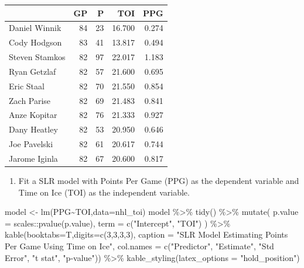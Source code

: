 \documentclass[
  11pt,
]{book}
\newenvironment{Shaded}{\begin{snugshade}}{\end{snugshade}}
\newcommand{\AttributeTok}[1]{\textcolor[rgb]{0.77,0.63,0.00}{#1}}
\newcommand{\DecValTok}[1]{\textcolor[rgb]{0.00,0.00,0.81}{#1}}
\newcommand{\FunctionTok}[1]{\textcolor[rgb]{0.00,0.00,0.00}{#1}}
\newcommand{\NormalTok}[1]{#1}
\newcommand{\OtherTok}[1]{\textcolor[rgb]{0.56,0.35,0.01}{#1}}
\newcommand{\SpecialCharTok}[1]{\textcolor[rgb]{0.00,0.00,0.00}{#1}}
\newcommand{\StringTok}[1]{\textcolor[rgb]{0.31,0.60,0.02}{#1}}
\providecommand{\tightlist}{%
  \setlength{\itemsep}{0pt}\setlength{\parskip}{0pt}}
\theoremstyle{definition}
\theoremstyle{definition}
\theoremstyle{definition}
\theoremstyle{definition}
\theoremstyle{remark}
\begin{document}
\begin{tabular}{lrrrr}
\toprule
  & GP & P & TOI & PPG\\
\midrule
Daniel Winnik & 84 & 23 & 16.700 & 0.274\\
Cody Hodgson & 83 & 41 & 13.817 & 0.494\\
Steven Stamkos & 82 & 97 & 22.017 & 1.183\\
Ryan Getzlaf & 82 & 57 & 21.600 & 0.695\\
Eric Staal & 82 & 70 & 21.550 & 0.854\\
\addlinespace
Zach Parise & 82 & 69 & 21.483 & 0.841\\
Anze Kopitar & 82 & 76 & 21.333 & 0.927\\
Dany Heatley & 82 & 53 & 20.950 & 0.646\\
Joe Pavelski & 82 & 61 & 20.617 & 0.744\\
Jarome Iginla & 82 & 67 & 20.600 & 0.817\\
\bottomrule
\end{tabular}

\newpage

\begin{enumerate}
\def\labelenumi{(\alph{enumi})}
\setcounter{enumi}{1}
\tightlist
\item
  Fit a SLR model with Points Per Game (PPG) as the dependent variable and Time on Ice (TOI) as the independent variable.
\end{enumerate}

\begin{Shaded}
\begin{Highlighting}[]
\NormalTok{model }\OtherTok{\textless{}{-}} \FunctionTok{lm}\NormalTok{(PPG}\SpecialCharTok{\textasciitilde{}}\NormalTok{TOI,}\AttributeTok{data=}\NormalTok{nhl\_toi)}
\NormalTok{model }\SpecialCharTok{\%\textgreater{}\%} \FunctionTok{tidy}\NormalTok{() }\SpecialCharTok{\%\textgreater{}\%}
  \FunctionTok{mutate}\NormalTok{(}
    \AttributeTok{p.value =}\NormalTok{ scales}\SpecialCharTok{::}\FunctionTok{pvalue}\NormalTok{(p.value),}
    \AttributeTok{term =} \FunctionTok{c}\NormalTok{(}\StringTok{"Intercept"}\NormalTok{, }\StringTok{"TOI"}\NormalTok{)}
\NormalTok{  ) }\SpecialCharTok{\%\textgreater{}\%}
  \FunctionTok{kable}\NormalTok{(}\AttributeTok{booktabs=}\NormalTok{T,}\AttributeTok{digits=}\FunctionTok{c}\NormalTok{(}\DecValTok{3}\NormalTok{,}\DecValTok{3}\NormalTok{,}\DecValTok{3}\NormalTok{,}\DecValTok{3}\NormalTok{), }
        \AttributeTok{caption =} \StringTok{"SLR Model Estimating Points Per Game Using Time on Ice"}\NormalTok{,}
        \AttributeTok{col.names =} \FunctionTok{c}\NormalTok{(}\StringTok{"Predictor"}\NormalTok{, }\StringTok{"Estimate"}\NormalTok{, }\StringTok{"Std Error"}\NormalTok{, }\StringTok{"t stat"}\NormalTok{, }\StringTok{"p{-}value"}\NormalTok{)) }\SpecialCharTok{\%\textgreater{}\%}
  \FunctionTok{kable\_styling}\NormalTok{(}\AttributeTok{latex\_options =} \StringTok{"hold\_position"}\NormalTok{)}
\end{Highlighting}
\end{Shaded}
\end{document}
